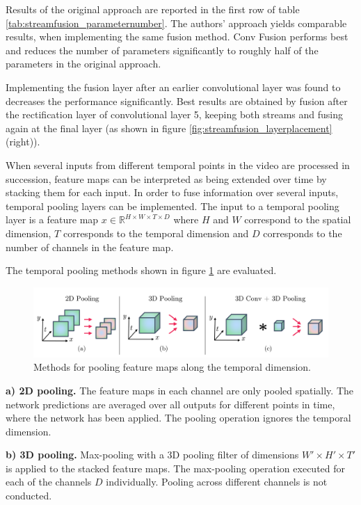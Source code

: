Results of the original approach are reported in the first row of table \ref{tab:streamfusion_parameternumber}.
The authors' approach yields comparable results, when implementing the same fusion method.
Conv Fusion performs best and reduces the number of parameters significantly to roughly half of the parameters in the original approach.

Implementing the fusion layer after an earlier convolutional layer was found to decreases the performance significantly.
Best results are obtained by fusion after the rectification layer of convolutional layer 5, keeping both streams and fusing again at the final layer (as shown in figure \ref{fig:streamfusion_layerplacement} (right)).

When several inputs from different temporal points in the video are processed in succession, feature maps can be interpreted as being extended over time by stacking them for each input.
In order to fuse information over several inputs, temporal pooling layers can be implemented.
The input to a temporal pooling layer is a feature map $x \in \mathbb{R}^{H \times W \times T \times D}$ where $H$ and $W$ correspond to the spatial dimension, $T$ corresponds to the temporal dimension and $D$ corresponds to the number of channels in the feature map.

The temporal pooling methods shown in figure \ref{fig:streamfusion_temppooling} are evaluated.

\begin{figure}[H]
    \centering
    \includegraphics[width=\textwidth]{img_deep/streamfusion_temppooling}
\caption{Methods for pooling feature maps along the temporal dimension. \cite{feichtenhofer_convolutional_2016}}
    \label{fig:streamfusion_temppooling}
\end{figure}

\textbf{a) 2D pooling.}
The feature maps in each channel are only pooled spatially.
The network predictions are averaged over all outputs for different points in time, where the network has been applied.
The pooling operation ignores the temporal dimension.

\textbf{b) 3D pooling.}
Max-pooling with a 3D pooling filter of dimensions $W' \times H' \times T'$ is applied to the stacked feature maps.
The max-pooling operation executed for each of the channels $D$ individually.
Pooling across different channels is not conducted.

